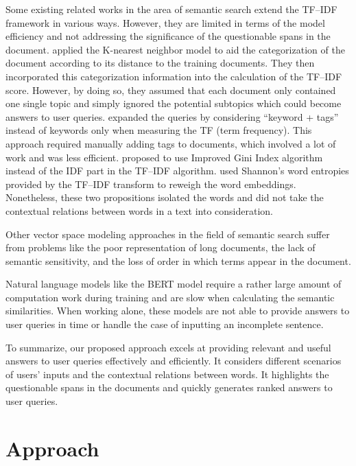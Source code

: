 Some existing related works in the area of semantic search extend the TF--IDF framework in various ways. However, they are limited in terms of the model efficiency and not addressing the significance of the questionable spans in the document. \citeauthor{trstenjak2014knn} \cite{trstenjak2014knn} applied the K-nearest neighbor model to aid the categorization of the document according to its distance to the training documents. They then incorporated this categorization information into the calculation of the TF--IDF score. However, by doing so, they assumed that each document only contained one single topic and simply ignored the potential subtopics which could become answers to user queries. \citeauthor{gautam2014semantic} \cite{gautam2014semantic} expanded the queries by considering ``keyword + tags'' instead of keywords only when measuring the TF (term frequency). This approach required manually adding tags to documents, which involved a lot of work and was less efficient. \citeauthor{arroyo2017unsupervised} \cite{shang2016improved} proposed to use Improved Gini Index algorithm instead of the IDF part in the TF--IDF algorithm.  \citeauthor{arroyo2017unsupervised} \cite{arroyo2017unsupervised} used Shannon's word entropies provided by the TF--IDF transform to reweigh the word embeddings. Nonetheless, these two propositions isolated the words and did not take the contextual relations between words in a text into consideration.

Other vector space modeling approaches \cite{rygl2017semantic, cao2012semantic, ngo2010combining} in the field of semantic search suffer from problems like the poor representation of long documents, the lack of semantic sensitivity, and the loss of order in which terms appear in the document.

Natural language models like the BERT model \cite{devlin2018bert} require a rather large amount of computation work during training and are slow when calculating the semantic similarities. When working alone, these models are not able to provide answers to user queries in time or handle the case of inputting an incomplete sentence.

To summarize, our proposed approach excels at providing relevant and useful answers to user queries effectively and efficiently. It considers different scenarios of users' inputs and the contextual relations between words. It highlights the questionable spans in the documents and quickly generates ranked answers to user queries.

\section{Approach}\label{sec:approach}

